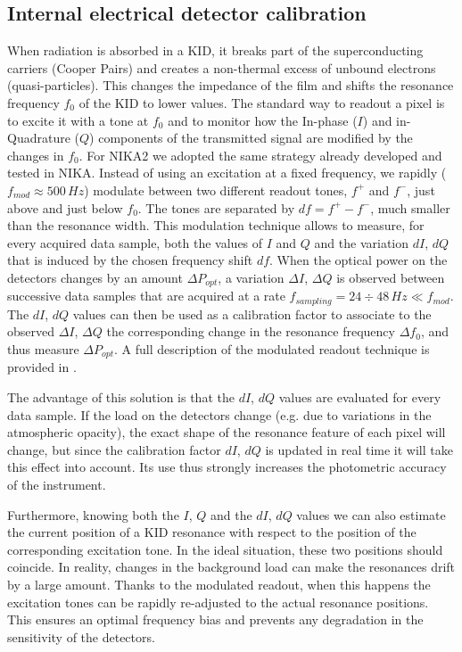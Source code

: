 \documentclass[]{aa} %
\begin{document}
\subsection{Internal electrical detector calibration}
\label{Internal detectors calibration}
When radiation is absorbed in a KID, it breaks part of the superconducting
carriers (Cooper Pairs) and creates a non-thermal excess of unbound electrons
(quasi-particles). This changes the impedance of the film and shifts the
resonance frequency $f_0$ of the KID to lower values.
The standard way to readout a pixel is to excite it with a tone at $f_0$ and to monitor how the In-phase ($I$) and in-Quadrature ($Q$) components of the transmitted signal are modified by the changes in $f_0$. For NIKA2 we adopted the same strategy already developed and tested in NIKA. Instead of using an excitation at a fixed frequency, we rapidly ($f_{mod} \approx 500\,Hz$) modulate between two different readout tones, $f^+$ and $f^-$, just above and just below $f_0$. The tones are separated by $df=f^+-f^-$, much smaller than the resonance width. This modulation technique allows to measure, for every acquired data sample, both the values of $I$ and $Q$ and the variation $dI$, $dQ$ that is induced by the chosen frequency shift $df$. When the optical power on the detectors changes by an amount $\Delta P_{opt}$, a variation $\Delta I$, $\Delta Q$ is observed between successive data samples that are acquired at a rate $f_{sampling} = 24\div48\,Hz \ll  f_{mod} $. The $dI$, $dQ$ values can then be used as a calibration factor to associate to the observed $\Delta I$, $\Delta Q$ the corresponding change in the resonance frequency $\Delta f_0$, and thus measure $\Delta P_{opt}$. A full description of the modulated readout technique is provided in \cite{Calvo2013}.

The advantage of this solution is that the $dI$, $dQ$ values are evaluated for every data sample. If the load on the detectors change (e.g. due to variations in the atmospheric opacity), the exact shape of the resonance feature of each pixel will change, but since the calibration factor $dI$, $dQ$ is updated in real time it will take this effect into account. Its use thus strongly increases the photometric accuracy of the instrument.

Furthermore, knowing both the $I$, $Q$ and the $dI$, $dQ$ values we can also estimate the current position of a KID resonance with respect to the position of the corresponding excitation tone. In the ideal situation, these two positions should coincide. In reality, changes in the background load can make the resonances drift by a large amount. Thanks to the modulated readout, when this happens the excitation tones can be rapidly re-adjusted to the actual resonance positions. This ensures an optimal frequency bias and prevents any degradation in the sensitivity of the detectors.
\end{document}
